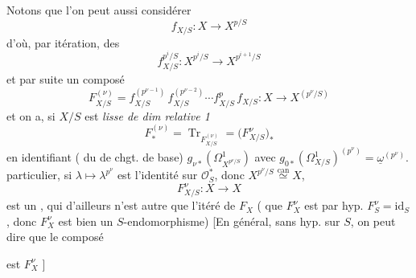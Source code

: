 \documentclass[11pt,a4paper]{article}
\begin{document}
Notons que l'on peut aussi considérer
\[
  f_{X/S} : X\longrightarrow X^{p/S}
\]
d'où, par itération, des
\[
  f_{X/S}^{p^i/S} : X^{p^i/S}\longrightarrow X^{p^{i+1}/S}
\]
et par suite un composé
\[
  F_{X/S}^{(\nu)} = f_{X/S}^{(p^{\nu-1})}\,f_{X/S}^{(p^{\nu-2})}\cdots f_{X/S}^{p}\,f_{X/S}
  : X\longrightarrow X^{(p^\nu/S)}
\]
et on a, si $X/S$ est \emph{lisse de dim relative 1}
\[
  F_*^{(\nu)} = \operatorname{Tr}_{F^{(\nu)}_{X/S}} = \bigl(F^{\nu}_{X/S}\bigr)_*
\]
en identifiant ( du  de chgt. de
base) $g_{\nu*}(\Omega^1_{X^{p^\nu/S}})$ avec
$g_{0*}(\Omega^1_{X/S})^{(p^\nu)} = \underline{\omega}^{(p^\nu)}$. 
particulier, si $\lambda\mapsto\lambda^{p^\nu}$ est l'identité sur
$\mathcal{O}_S^*$, donc $X^{p^\nu/S}\overset{\text{can}}{\simeq}X$, 
\[
  F^{\nu}_{X/S} : X\longrightarrow X
\]
est un , qui d'ailleurs n'est autre que l'itéré
\uncertain{\ill{}} de $F_X$ (  que
$F_X^{\nu}$ est \uncertain{\ill{}} par hyp. $F_S^{\nu} = \mathrm{id}_S$, donc
 $F_X^{\nu}$ est bien un $S$-endomorphisme) [En général, sans
hyp. sur $S$, on peut dire que le composé



est $F_X^{\nu}$ ]
\end{document}
